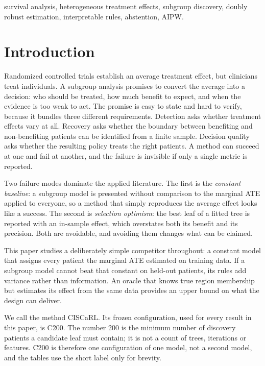 \documentclass[conference]{IEEEtran}
\begin{document}
\begin{IEEEkeywords}
survival analysis, heterogeneous treatment effects, subgroup discovery, doubly
robust estimation, interpretable rules, abstention, AIPW.
\end{IEEEkeywords}

\section{Introduction}

Randomized controlled trials establish an average treatment effect, but
clinicians treat individuals. A subgroup analysis promises to convert the
average into a decision: who should be treated, how much benefit to expect, and
when the evidence is too weak to act. The promise is easy to state and hard to
verify, because it bundles three different requirements. Detection asks whether
treatment effects vary at all. Recovery asks whether the boundary between
benefiting and non-benefiting patients can be identified from a finite sample.
Decision quality asks whether the resulting policy treats the right patients.
A method can succeed at one and fail at another, and the failure is invisible
if only a single metric is reported.

Two failure modes dominate the applied literature. The first is the
\emph{constant baseline}: a subgroup model is presented without comparison to
the marginal ATE applied to everyone, so a method that simply reproduces the
average effect looks like a success. The second is \emph{selection optimism}:
the best leaf of a fitted tree is reported with an in-sample effect, which
overstates both its benefit and its precision. Both are avoidable, and avoiding
them changes what can be claimed.

This paper studies a deliberately simple competitor throughout: a constant
model that assigns every patient the marginal ATE estimated on training data.
If a subgroup model cannot beat that constant on held-out patients, its rules
add variance rather than information. An oracle that knows true region
membership but estimates its effect from the same data provides an upper bound
on what the design can deliver.

We call the method CISCaRL. Its frozen configuration, used for every result in
this paper, is C200. The number 200 is the minimum number of discovery patients
a candidate leaf must contain; it is not a count of trees, iterations or
features. C200 is therefore one configuration of one model, not a second model,
and the tables use the short label only for brevity.
\end{document}
